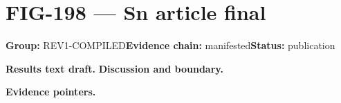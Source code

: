 \clearpage
\section{FIG-198 --- Sn article final}
\label{figpage:fig-198}
\textbf{Group:} REV1-COMPILED\quad \textbf{Evidence chain:} manifested\quad \textbf{Status:} publication

\textbf{Results text draft.} 
\textbf{Discussion and boundary.} 


\textbf{Evidence pointers.}



\vfill
